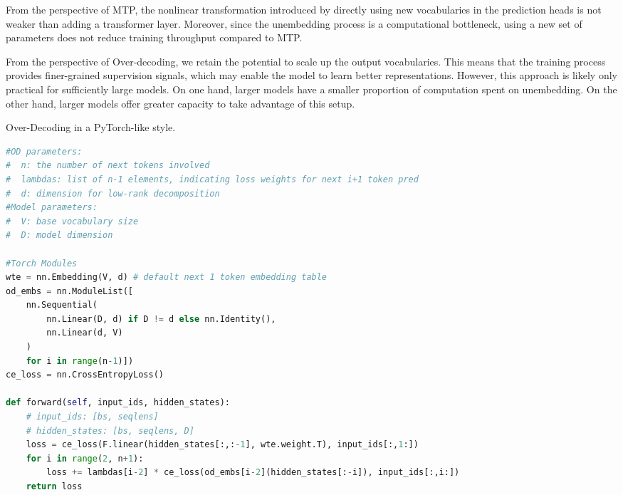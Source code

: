 From the perspective of MTP, the nonlinear transformation introduced by directly using new vocabularies in the prediction heads is not weaker than adding a transformer layer. Moreover, since the unembedding process is a computational bottleneck, using a new set of parameters does not reduce training throughput compared to MTP.

From the perspective of Over-decoding, we retain the potential to scale up the output vocabularies. This means that the training process provides finer-grained supervision signals, which may enable the model to learn better representations. However, this approach is likely only practical for sufficiently large models. On one hand, larger models have a smaller proportion of computation spent on unembedding. On the other hand, larger models offer greater capacity to take advantage of this setup.


\begin{algorithm}[h]
\caption{Over-Decoding in a PyTorch-like style.}
\label{alg:torch_od_impl}

\begin{lstlisting}[language=python]
#OD parameters:
#  n: the number of next tokens involved
#  lambdas: list of n-1 elements, indicating loss weights for next i+1 token pred
#  d: dimension for low-rank decomposition
#Model parameters:
#  V: base vocabulary size
#  D: model dimension

#Torch Modules
wte = nn.Embedding(V, d) # default next 1 token embedding table
od_embs = nn.ModuleList([
    nn.Sequential(
        nn.Linear(D, d) if D != d else nn.Identity(),
        nn.Linear(d, V)
    ) 
    for i in range(n-1)])
ce_loss = nn.CrossEntropyLoss()

def forward(self, input_ids, hidden_states):
    # input_ids: [bs, seqlens]
    # hidden_states: [bs, seqlens, D]
    loss = ce_loss(F.linear(hidden_states[:,:-1], wte.weight.T), input_ids[:,1:])
    for i in range(2, n+1):
        loss += lambdas[i-2] * ce_loss(od_embs[i-2](hidden_states[:-i]), input_ids[:,i:])
    return loss

\end{lstlisting}
\end{algorithm}



